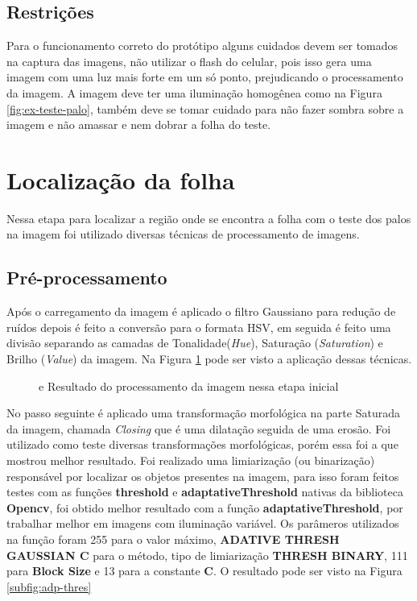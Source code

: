 \subsection{Restrições}
\label{subsec:restricoes}
Para o funcionamento correto do protótipo alguns cuidados devem ser tomados na captura das imagens, não utilizar o flash do celular, pois isso gera uma imagem com uma luz mais forte em um só ponto, prejudicando o processamento da imagem. A imagem deve ter uma iluminação homogênea como na Figura \ref{fig:ex-teste-palo}, também deve se tomar cuidado para não fazer sombra sobre a imagem e não amassar e nem dobrar a folha do teste.

\section{Localização da folha}
\label{sec:loc-folha}

Nessa etapa para localizar a região onde se encontra a folha com o teste dos palos na imagem foi utilizado diversas técnicas de processamento de imagens. 

\subsection{Pré-processamento}
\label{sec:pre-proce}

Após o carregamento da imagem é aplicado o filtro Gaussiano para redução de ruídos depois é  feito a conversão para o formata HSV, em seguida é feito uma divisão separando as camadas de Tonalidade(\textit{Hue}), Saturação (\textit{Saturation}) e  Brilho (\textit{Value}) da imagem. Na Figura  \ref{fig:subfiguras} pode ser visto a aplicação dessas técnicas.
\begin{figure}[h]
 \centering
   \qquad
   \caption{{} e {} Resultado do processamento da imagem nessa etapa inicial }
  \label{fig:subfiguras}
\end{figure}
No passo seguinte é aplicado uma transformação morfológica na parte Saturada da imagem,  chamada \textit{Closing} que é uma dilatação seguida de uma erosão. Foi utilizado como teste diversas transformações morfológicas, porém essa foi a que mostrou melhor resultado. Foi realizado uma limiarização (ou binarização) responsável por localizar os objetos presentes na imagem, para isso foram feitos testes com as funções \textbf{threshold} e \textbf{adaptativeThreshold} nativas da biblioteca \textbf{Opencv}, foi obtido  melhor resultado com a função \textbf{adaptativeThreshold}, por trabalhar melhor em imagens com iluminação variável. Os parâmeros utilizados na função foram 255 para o valor máximo, \textbf{ADATIVE THRESH GAUSSIAN C}  para o método, tipo de limiarização \textbf{THRESH BINARY}, 111 para \textbf{Block Size } e 13 para a constante \textbf{C}.
O resultado pode ser visto na Figura  \ref{subfig:adp-thres} 

